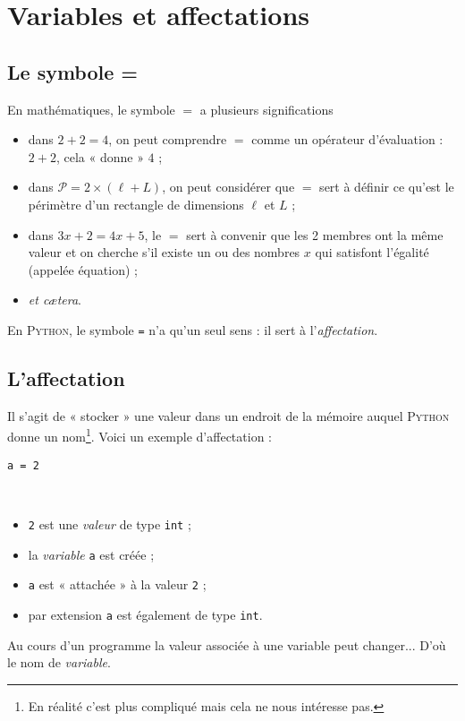 \documentclass{nsibook}
\begin{document}
\chapter{Variables et affectations}

\section{Le symbole =}

En mathématiques, le symbole $=$ a plusieurs significations
\begin{itemize}
	\item dans $2+2=4$, on peut comprendre $=$ comme un opérateur d'évaluation : $2+2$, cela « donne » $4$ ;
	\item dans $\mathcal{P}=2\times(\ell+L)$, on peut considérer que $=$ sert à définir ce qu'est le périmètre d'un rectangle de dimensions $\ell$ et $L$ ; 
	\item dans $3x + 2 = 4x +5$, le $=$ sert à convenir que les 2 membres ont la même valeur et on cherche s'il existe un ou des nombres $x$ qui satisfont l'égalité (appelée équation) ;
	\item \textit{et cætera}. 
\end{itemize}

En \textsc{Python}, le symbole \texttt{=}  n'a qu'un seul sens : il sert à l'\textit{affectation}.

\section{L'affectation}
Il s'agit de « stocker » une valeur dans un endroit de la mémoire auquel \textsc{Python} donne un nom\footnote{En réalité c'est plus compliqué mais cela ne nous intéresse pas.}. Voici un exemple d'affectation : 
\begin{center}\Large
\texttt{a = 2}
\end{center}\
\begin{itemize}
\item   \texttt{2} est une \textit{valeur} de type \texttt{int} ;
\item   la \textit{variable} \texttt{a} est créée ;\
\item   \texttt{a} est « attachée » à la valeur \texttt{2} ;
\item   par extension \texttt{a} est également de type \texttt{int}.
\end{itemize}
Au cours d'un programme la valeur associée à une variable peut changer... D'où le nom de \textit{variable}.\\
\end{document}
